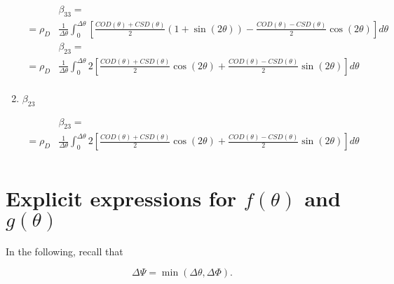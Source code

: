 \documentclass[review]{elsarticle}
\begin{document}
\begin{enumerate}
\begin{equation}
\begin{aligned}
&\beta_{33}=\\
=\rho_{D}&\frac{1}{\Delta\theta}\int_{0}^{\Delta\theta}\left[\frac{COD\left(\theta\right)+CSD\left(\theta\right)}{2}\left(1+\sin\left(2\theta\right)\right)-\frac{COD\left(\theta\right)-CSD\left(\theta\right)}{2}\cos\left(2\theta\right)\right]d\theta\\
&\beta_{23}=\\
=\rho_{D}&\frac{1}{\Delta\theta}\int_{0}^{\Delta\theta}2\left[\frac{COD\left(\theta\right)+CSD\left(\theta\right)}{2}\cos\left(2\theta\right)+\frac{COD\left(\theta\right)-CSD\left(\theta\right)}{2}\sin\left(2\theta\right)\right]d\theta\\
\end{aligned}
\end{equation}

\item $\beta_{23}$

\begin{equation}
\begin{aligned}
&\beta_{23}=\\
=\rho_{D}&\frac{1}{\Delta\theta}\int_{0}^{\Delta\theta}2\left[\frac{COD\left(\theta\right)+CSD\left(\theta\right)}{2}\cos\left(2\theta\right)+\frac{COD\left(\theta\right)-CSD\left(\theta\right)}{2}\sin\left(2\theta\right)\right]d\theta\\
\end{aligned}
\end{equation}

\end{enumerate}



\appendix
\section{Explicit expressions for $f\left(\theta\right)$ and $g\left(\theta\right)$}\label{app:fandgexplicit}

In the following, recall that

\begin{equation}
\Delta\Psi=\min\left(\Delta\theta,\Delta\Phi\right).
\end{equation}
\end{document}
